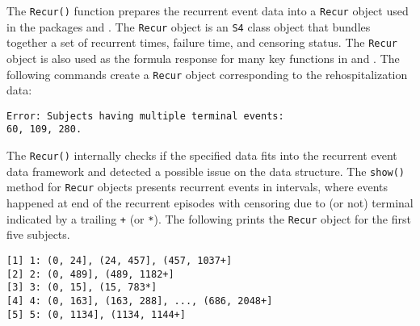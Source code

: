 The \texttt{Recur()} function prepares the recurrent event data into a
\texttt{Recur} object used in the packages  and .
The \texttt{Recur} object is an \texttt{S4} class object that bundles
together a set of recurrent times, failure time, and censoring status.
The \texttt{Recur} object is also used as the formula response for many
key functions in  and . The following commands
create a \texttt{Recur} object corresponding to the rehospitalization
data:

\begin{Shaded}
\begin{Highlighting}[]
 \NormalTok{)}
\end{Highlighting}
\end{Shaded}

\begin{verbatim}
Error: Subjects having multiple terminal events:
60, 109, 280.
\end{verbatim}

The \texttt{Recur()} internally checks if the specified data fits into
the recurrent event data framework and detected a possible issue on the
data structure. The \texttt{show()} method for \texttt{Recur} objects
presents recurrent events in intervals, where events happened at end of
the recurrent episodes with censoring due to (or not) terminal indicated
by a trailing \texttt{+} (or \texttt{*}). The following prints the
\texttt{Recur} object for the first five subjects.

\begin{Shaded}
\begin{Highlighting}[]
\NormalTok{(readmission[}\NormalTok{:}\NormalTok{,], }
\end{Highlighting}
\end{Shaded}

\begin{verbatim}
[1] 1: (0, 24], (24, 457], (457, 1037+]       
[2] 2: (0, 489], (489, 1182+]                 
[3] 3: (0, 15], (15, 783*]                    
[4] 4: (0, 163], (163, 288], ..., (686, 2048+]
[5] 5: (0, 1134], (1134, 1144+]               
\end{verbatim}
